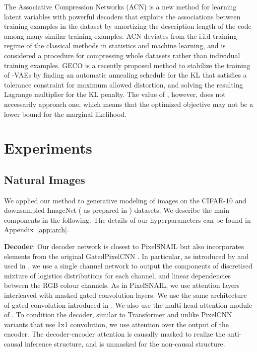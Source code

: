 \documentclass{article} \usepackage{iclr2019_conference,times}
\newcommand{\aref}[1]{Appendix~\ref{#1}}
\begin{document}
The Associative Compression Networks (ACN) \citep{ACN} is a new method for learning latent variables with powerful decoders that exploits the associations between training examples in the dataset by amortizing the description length of the code among many similar training examples. ACN deviates from the i.i.d training regime of the classical methods in statistics and machine learning, and is considered a procedure for compressing whole datasets rather than individual training examples. GECO \citep{Geco} is a recently proposed method to stabilize the training of -VAEs by finding an automatic
annealing schedule for the KL that satisfies a tolerance constraint for maximum allowed distortion, and solving the resulting Lagrange multiplier for the KL penalty. The value of , however, does not necessarily approach one, which means that the optimized objective may not be a lower bound for the marginal likelihood. \section{Experiments}\label{sec:exp}

\subsection{Natural Images}
We applied our method to generative modeling of images on the CIFAR-10 \citep{cifar10} and downsampled ImageNet \citep{imagenet} ( as prepared in \cite{PixelRNN}) datasets. We describe the main components in the following. The details of our hyperparameters can be found in \aref{app:arch}.

\textbf{Decoder}: Our decoder network is closest to PixelSNAIL \citep{PixelSnail} but also incorporates elements from the original GatedPixelCNN \citep{pixelcnn}. In particular, as introduced by \cite{PixelCNN++} and used in \cite{PixelSnail}, we use a single channel network to output the components of discretised mixture of logistics distributions for each channel, and linear dependencies between the RGB colour channels. As in PixelSNAIL, we use attention layers interleaved with masked gated convolution layers. We use the same architecture of gated convolution introduced in \cite{pixelcnn}. We also use the multi-head attention module of \cite{Vaswani2017}. To condition the decoder, similar to Transformer and unlike PixelCNN variants that use 1x1 convolution,  we use attention over the output of the encoder. The decoder-encoder attention is causally masked to realize the anti-causal inference structure, and is unmasked for the non-causal structure. 
\end{document}
